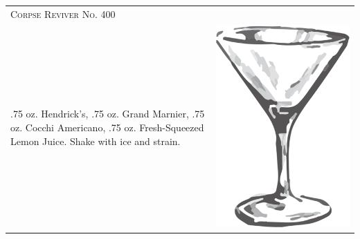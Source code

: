 \documentclass{article}
\begin{document}
\begin{tabular}{p{2in} p{0.5in}}
\multicolumn{2}{p{3in}}{\centering\Huge\textsc{Corpse Reviver No. 400}}\\ 
  \vspace{-0.1in}.75 oz. Hendrick's, .75 oz. Grand Marnier, .75 oz. Cocchi Americano, .75 oz. Fresh-Squeezed Lemon Juice. Shake with ice and strain. &
  \vspace{-0.1in} \includegraphics{goblet.png}
\end{tabular}\
\end{document}
